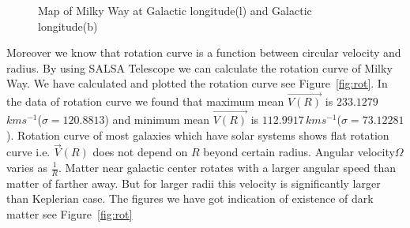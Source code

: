 \documentclass[10pt,conference]{IEEEtran}
\begin{document}
\begin{figure}[!t]
{\label{fig_fifth_case}}
\hfil
{}
\hfil
{}
\hfil
{}
\hfil
\caption{Map of Milky Way at Galactic longitude(l) and Galactic longitude(b)}
\label{fig:map}
\end{figure}

Moreover we know that rotation curve is a function between circular velocity and radius. By using SALSA Telescope we can calculate the rotation curve of Milky Way\cite{CathyHorellou2015}. We have calculated and plotted the rotation curve see Figure~\ref{fig:rot}. In the data of rotation curve we found that maximum mean $\vec{V(R)}$ is $233.1279$\,$kms^{-1}$($\sigma=120.8813$) and minimum mean $\vec{V(R)}$ is $112.9917$\,$kms^{-1}$($\sigma=73.12281$). Rotation curve of most galaxies which have solar systems shows flat rotation curve i.e. $\vec{V}(\mathit{R})$ does not depend on $\mathit{R}$ beyond certain radius. Angular velocity$\Omega$ varies as $\frac{1}{\mathit{R}}$. Matter near galactic center rotates with a larger angular speed than matter of farther away. But for larger radii this velocity is significantly larger than Keplerian case\cite{CathyHorellou2015}. The figures we have got indication of existence of dark matter see Figure~\ref{fig:rot}
\end{document}
